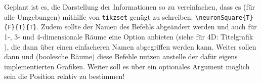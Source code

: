 Geplant ist es, die Darstellung der Informationen so zu vereinfachen, dass es (für alle Umgebungen) mithilfe von \verb|tikzset| genügt zu schreiben: \verb|\neuronSquare{T}{F}{T}{T}|.
Zudem sollte der Namen des Befehls abgeändert werden und auch für 1-, 3- und 4-dimensionale Räume eine Option anbieten (siehe für 4D: Titelgrafik \gdra), die dann über einen einfacheren Namen abgegriffen werden kann. Weiter sollen dann \fg und \gdra (boolesche Räume) diese Befehle nutzen anstelle der dafür eigens implementierten Grafiken. Weiter soll es über ein optionales Argument möglich sein die Position relativ zu bestimmen!
\normalmarginpar

\renewcommand{\arraystretch}{1}
